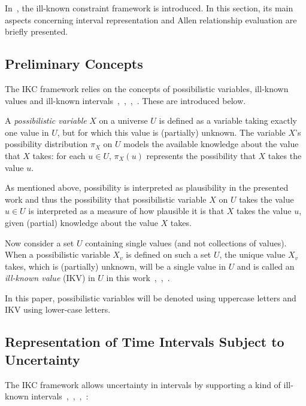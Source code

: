 In~\cite{Pons2011}, the ill-known constraint framework is introduced. In this section, its main aspects concerning interval representation and Allen relationship evaluation are briefly presented.

\subsection{\label{subsec:ikc-preliminaries}Preliminary Concepts}
The IKC framework relies on the concepts of possibilistic variables, ill-known values and ill-known intervals~\cite{Dubois1983},~\cite{Pons2011},~\cite{Billiet2012},~\cite{JoseEnriquePons2012}. These are introduced below.

\begin{definition}
\label{def:poss-variable}
A \emph{possibilistic variable} $X$ on a universe $U$ is defined as a variable taking exactly one value in $U$, but for which this value is (partially) unknown. The variable $X$'s possibility distribution $\pi_X$ on $U$ models the available knowledge about the value that $X$ takes: for each $u \in U$, $\pi_X(u)$ represents the possibility that $X$ takes the value $u$.
\end{definition}

As mentioned above, possibility is interpreted as plausibility in the presented work and thus the possibility that possibilistic variable $X$ on $U$ takes the value $u \in U$ is interpreted as a measure of how plausible it is that $X$ takes the value $u$, given (partial) knowledge about the value $X$ takes.

Now consider a set $U$ containing single values (and not collections of values). When a possibilistic variable $X_{v}$ is defined on such a set $U$, the unique value $X_{v}$ takes, which is (partially) unknown, will be a single value in $U$ and is called an \emph{ill-known value} (IKV) in $U$ in this work~\cite{Dubois1988},~\cite{Pons2011},~\cite{Billiet2012}.

In this paper, possibilistic variables will be denoted using uppercase letters and IKV using lower-case letters.

\subsection{\label{subsec:ikc-interval}Representation of Time Intervals Subject to Uncertainty}
The IKC framework allows uncertainty in intervals by supporting a kind of ill-known intervals~\cite{Dubois1983},~\cite{Pons2011},~\cite{Billiet2012},~\cite{JoseEnriquePons2012}:

